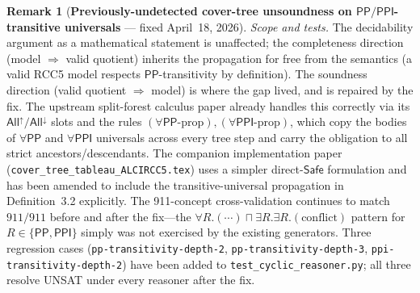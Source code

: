 \documentclass[
]{ceurart}
\theoremstyle{definition}
\newtheorem{remark}[theorem]{Remark}
\newcommand{\PP}{\ensuremath{\mathsf{PP}}}
\newcommand{\PPI}{\ensuremath{\mathsf{PPI}}}
\newcommand{\Safe}{\ensuremath{\mathsf{Safe}}}
\begin{document}
\begin{remark}[\textbf{Previously-undetected cover-tree unsoundness on $\PP/\PPI$-transitive universals} --- fixed April~18, 2026]
\emph{Scope and tests.} The decidability argument as a
mathematical statement is unaffected; the completeness direction
(model $\Rightarrow$ valid quotient) inherits the propagation for
free from the semantics (a valid RCC5 model respects
$\PP$-transitivity by definition). The soundness direction
(valid quotient $\Rightarrow$ model) is where the gap lived, and
is repaired by the fix. The upstream split-forest calculus paper
already handles this correctly via its $\mathsf{All}^\uparrow /
\mathsf{All}^\downarrow$ slots and the rules
$(\forall\PP\text{-prop}),
(\forall\PPI\text{-prop})$, which copy the bodies of $\forall\PP$
and $\forall\PPI$ universals across every tree step and carry the
obligation to all strict ancestors/descendants. The companion
implementation paper (\texttt{cover\_tree\_tableau\_ALCIRCC5.tex})
uses a simpler direct-$\Safe$ formulation and has been amended to
include the transitive-universal propagation in
Definition~3.2 explicitly. The
911-concept cross-validation continues to match $911/911$ before
and after the fix---the $\forall R.(\cdots) \sqcap \exists R.
\exists R.(\mathrm{conflict})$ pattern for $R \in \{\PP, \PPI\}$
simply was not exercised by the existing generators.
Three regression cases (\texttt{pp-transitivity-depth-2},
\texttt{pp-transitivity-depth-3},
\texttt{ppi-transitivity-depth-2}) have been added to
\texttt{test\_cyclic\_reasoner.py}; all three resolve UNSAT under
every reasoner after the fix.
\end{remark}
\end{document}

